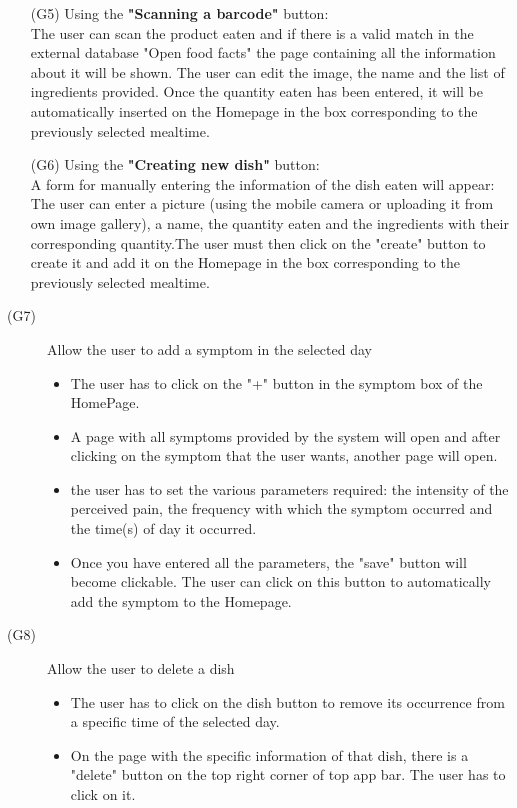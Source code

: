 \documentclass [12pt]{article}
\begin{document}
\begin{description}
\begin{itemize}
\item[(G5)] Using the \textbf{"Scanning a barcode"} button:\\
The user can scan the product eaten and if there is a valid match in the external database "Open food facts" the page containing all the information about it will be shown.  The user can edit the image, the name and the list of ingredients provided. Once the quantity eaten has been entered, it will be automatically inserted on the Homepage in the box corresponding to the previously selected mealtime.
\item[(G6)] Using the \textbf{"Creating new dish"} button:\\
A form for manually entering the information of the dish eaten will appear: 
The user can enter a picture (using the mobile camera or uploading it from own image gallery), a name, the quantity eaten and the ingredients with their corresponding quantity.The user must then click on the "create" button to create it and add it on the Homepage in the box corresponding to the previously selected mealtime. 
\end{itemize}
\end{description}

\begin{description}
\item[(G7)]Allow the user to add a symptom in the selected day
\begin{itemize}
\item The user has to click on the "+" button in the symptom box of the HomePage.
\item A page with all symptoms provided by the system will open and after clicking on the symptom that the user wants, another page will open.
\item the user has to set the various parameters required: the intensity of the perceived pain, the frequency with which the symptom occurred and the time(s) of day it occurred. 
\item Once you have entered all the parameters, the "save" button will become clickable. The user can click on this button to automatically add the symptom to the Homepage.
\end{itemize}
\end{description}

\begin{description}
\item[(G8)]Allow the user to delete a dish
\begin{itemize}
\item The user has to click on the dish button to remove its occurrence from a specific time of the selected day. 
\item On the page with the specific information of that dish, there is a "delete" button on the top right corner of top app bar. The user has to click on it.
\end{itemize}
\end{description}
\end{document}
